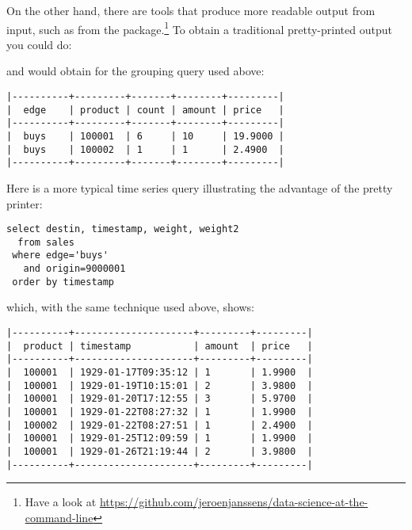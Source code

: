 
On the other hand, there are tools that
produce more readable output from  input,
such as  from the  package.\footnote{Have
a look at
\url{https://github.com/jeroenjanssens/data-science-at-the-command-line}}
To obtain a traditional pretty-printed output you could do:


and would obtain for the grouping query used above:

\begin{verbatim}
|----------+---------+-------+--------+---------|
|  edge    | product | count | amount | price   |
|----------+---------+-------+--------+---------|
|  buys    | 100001  | 6     | 10     | 19.9000 |
|  buys    | 100002  | 1     | 1      | 2.4900  |
|----------+---------+-------+--------+---------|
\end{verbatim}

Here is a more typical time series query illustrating
the advantage of the pretty printer:

\begin{verbatim}
select destin, timestamp, weight, weight2
  from sales 
 where edge='buys' 
   and origin=9000001 
 order by timestamp
\end{verbatim}

which, with the same technique used above, shows:

\begin{verbatim}
|----------+---------------------+---------+---------|
|  product | timestamp           | amount  | price   |
|----------+---------------------+---------+---------|
|  100001  | 1929-01-17T09:35:12 | 1       | 1.9900  |
|  100001  | 1929-01-19T10:15:01 | 2       | 3.9800  |
|  100001  | 1929-01-20T17:12:55 | 3       | 5.9700  |
|  100001  | 1929-01-22T08:27:32 | 1       | 1.9900  |
|  100002  | 1929-01-22T08:27:51 | 1       | 2.4900  |
|  100001  | 1929-01-25T12:09:59 | 1       | 1.9900  |
|  100001  | 1929-01-26T21:19:44 | 2       | 3.9800  |
|----------+---------------------+---------+---------|
\end{verbatim}

